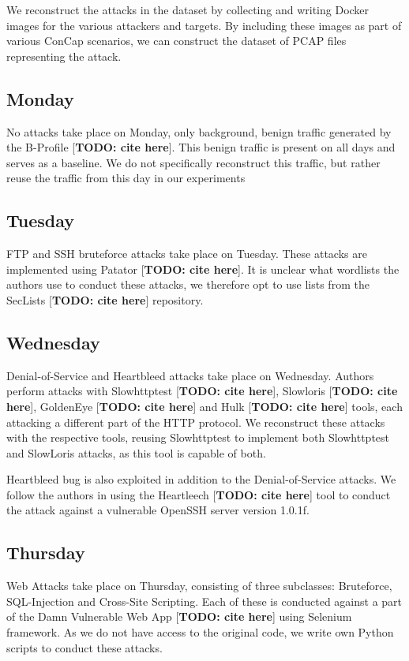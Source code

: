 \documentclass[conference]{IEEEtran}
\begin{document}
	We reconstruct the attacks in the dataset by collecting and writing Docker images for the various attackers and targets. By including these images as part of various ConCap scenarios, we can construct the dataset of PCAP files representing the attack.
	\subsection{Monday}
	
	No attacks take place on Monday, only background, benign traffic generated by the B-Profile [\textbf{TODO: cite here}]. This benign traffic is present on all days and serves as a baseline. We do not specifically reconstruct this traffic, but rather reuse the traffic from this day in our experiments
	
	\subsection{Tuesday}
	FTP and SSH bruteforce attacks take place on Tuesday. These attacks are implemented using Patator [\textbf{TODO: cite here}]. It is unclear what wordlists the authors use to conduct these attacks, we therefore opt to use lists from the SecLists [\textbf{TODO: cite here}] repository.
	
	\subsection{Wednesday}
	Denial-of-Service and Heartbleed attacks take place on Wednesday. Authors perform attacks with Slowhttptest [\textbf{TODO: cite here}], Slowloris [\textbf{TODO: cite here}], GoldenEye [\textbf{TODO: cite here}] and Hulk [\textbf{TODO: cite here}] tools, each attacking a different part of the HTTP protocol. We reconstruct these attacks with the respective tools, reusing Slowhttptest to implement both Slowhttptest and SlowLoris attacks, as this tool is capable of both. 
	
	Heartbleed bug is also exploited in addition to the Denial-of-Service attacks. We follow the authors in using the Heartleech [\textbf{TODO: cite here}] tool to conduct the attack against a vulnerable OpenSSH server version 1.0.1f. 
	
	\subsection{Thursday}
	Web Attacks take place on Thursday, consisting of three subclasses: Bruteforce, SQL-Injection and Cross-Site Scripting. Each of these is conducted against a part of the Damn Vulnerable Web App [\textbf{TODO: cite here}] using Selenium framework. As we do not have access to the original code, we write own Python scripts to conduct these attacks.
	
\end{document}
